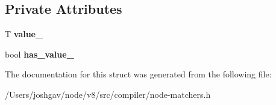 \subsection*{Private Attributes}
\begin{DoxyCompactItemize}
\item 
T {\bfseries value\+\_\+}\hypertarget{structv8_1_1internal_1_1compiler_1_1_value_matcher_ac37afd26dd53669989b1922b81e18856}{}\label{structv8_1_1internal_1_1compiler_1_1_value_matcher_ac37afd26dd53669989b1922b81e18856}

\item 
bool {\bfseries has\+\_\+value\+\_\+}\hypertarget{structv8_1_1internal_1_1compiler_1_1_value_matcher_a6b23ecef7395769c12bb872a65ba57c1}{}\label{structv8_1_1internal_1_1compiler_1_1_value_matcher_a6b23ecef7395769c12bb872a65ba57c1}

\end{DoxyCompactItemize}


The documentation for this struct was generated from the following file\+:\begin{DoxyCompactItemize}
\item 
/\+Users/joshgav/node/v8/src/compiler/node-\/matchers.\+h\end{DoxyCompactItemize}

